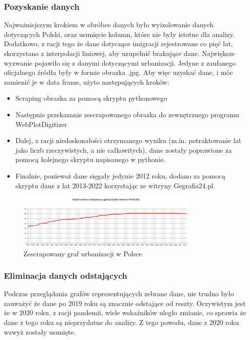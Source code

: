\documentclass[11pt]{article}
\begin{document}
\subsubsection*{Pozyskanie danych}
Najważniejszym krokiem w obróbce danych było wyizolowanie danych dotyczących Polski, oraz usunięcie kolumn, które nie były istotne dla analizy.
Dodatkowo, z racji tego że dane dotyczące imigracji rejestrowane co pięć lat, skorzystano z interpolacji liniowej, aby uzupełnić brakujące dane.
Największe wyzwanie pojawiło się z danymi dotyczącymi urbanizacji. Jedyne z zaufanego oficjalnego źródła były w formie obrazka .jpg.
Aby więc uzyskać dane, i móc zamienić je w data frame, użyto następujących kroków:
\begin{itemize}
\item Scraping obrazka za pomocą skryptu pythonowego
\item Następnie przekazanie zescrapowanego obrazka do zewnętrznego programu WebPlotDigitizer\cite{wpd}
\item Dalej, z racji niedoskonałości otrzymanego wyniku (m.in. potraktowanie lat jako liczb rzeczywistych, a nie całkowitych), dane zostały poprawione za pomocą kolejnego skryptu napisanego w pythonie.
\item Finalnie, ponieważ dane sięgały jedynie 2012 roku, dodano za pomocą skryptu dane z lat 2013-2022 korzystając ze witryny Gegrafia24.pl\cite{gf24}. 
\end{itemize}
\begin{figure}[H]
        \centering
        \includegraphics[width=0.8\textwidth]{urbanizacjawPolsce.png}
        \caption{Zescrapowany graf urbanizacji w Polsce}
\end{figure}
\subsubsection*{Eliminacja danych odstających}
Podczas przeglądania grafów reprezentujących zebrane dane, nie trudno było zauważyć że dane po 2019 roku są znacznie odstające od reszty.
Oczywistym jest że w 2020 roku, z racji pandemii, wiele wskaźników uległo zmianie, co sprawia że dane z tego roku są nieprzydatne do analizy.
Z tego powodu, dane z 2020 roku wzwyż zostały usunięte.
\end{document}
